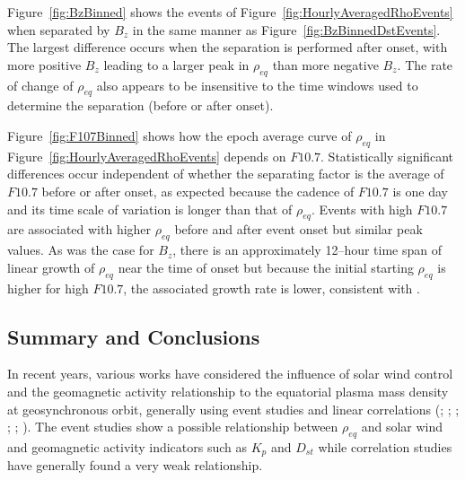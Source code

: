 \documentclass[12pt]{article}
\begin{document}
Figure~\ref{fig:BzBinned} shows the events of Figure~\ref{fig:HourlyAveragedRhoEvents} when separated by $B_z$ in the same manner as Figure~\ref{fig:BzBinnedDstEvents}.  The largest difference occurs when the separation is performed after onset, with more positive $B_z$ leading to a larger peak in $\rho_{eq}$ than more negative $B_{z}$.  The rate of change of $\rho_{eq}$ also appears to be insensitive to the time windows used to determine the separation (before or after onset).  


Figure~\ref{fig:F107Binned} shows how the epoch average curve of $\rho_{eq}$ in Figure~\ref{fig:HourlyAveragedRhoEvents} depends on $F10.7$.  Statistically significant differences occur independent of whether the separating factor is the average of $F10.7$ before or after onset, as expected because the cadence of $F10.7$ is one day and its time scale of variation is longer than that of $\rho_{eq}$.  Events with high $F10.7$ are associated with higher $\rho_{eq}$ before and after event onset but similar peak values.  As was the case for $B_z$, there is an approximately 12--hour time span of linear growth of $\rho_{eq}$ near the time of onset but because the initial starting $\rho_{eq}$ is higher for high $F10.7$, the associated growth rate is lower, consistent with \cite{Denton2016}.

\subsection{Summary and Conclusions}

In recent years, various works have considered the influence of solar wind control and the geomagnetic activity relationship to the equatorial plasma mass density at geosynchronous orbit, generally using event studies and linear correlations (\cite{Takahashi2006}; \cite{Denton2006}; \cite{Yao2008}; \cite{Takahashi2010}; \cite{Denton2011}; \cite{Denton2016}).  The event studies show a possible relationship between $\rho_{eq}$ and solar wind and geomagnetic activity indicators such as $K_p$ and $D_{st}$ while correlation studies have generally found a very weak relationship.
\end{document}
